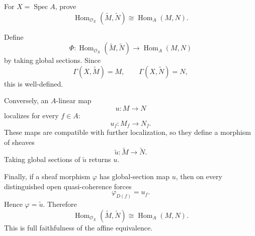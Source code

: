 \begin{problem}\label{prob:vi33-11}
For \(X=\operatorname{Spec}A\), prove
\[
\operatorname{Hom}_{\mathcal O_X}(\widetilde M,\widetilde N)
\cong
\operatorname{Hom}_A(M,N).
\]
\end{problem}

\ifdefined\FullProblemDossiers
\begin{solution}
Define
\[
\Phi:
\operatorname{Hom}_{\mathcal O_X}(\widetilde M,\widetilde N)
\to
\operatorname{Hom}_A(M,N)
\]
by taking global sections.  Since
\[
\Gamma(X,\widetilde M)=M,
\qquad
\Gamma(X,\widetilde N)=N,
\]
this is well-defined.

Conversely, an \(A\)-linear map
\[
u:M\to N
\]
localizes for every \(f\in A\):
\[
u_f:M_f\to N_f.
\]
These maps are compatible with further localization, so they define a morphism of sheaves
\[
\widetilde u:\widetilde M\to\widetilde N.
\]
Taking global sections of \(\widetilde u\) returns \(u\).

Finally, if a sheaf morphism \(\varphi\) has global-section map \(u\), then on every distinguished open
quasi-coherence forces
\[
\varphi_{D(f)}=u_f.
\]
Hence \(\varphi=\widetilde u\). Therefore
\[
\boxed{
\operatorname{Hom}_{\mathcal O_X}(\widetilde M,\widetilde N)
\cong
\operatorname{Hom}_A(M,N).
}
\]
This is full faithfulness of the affine equivalence.
\end{solution}
\fi
